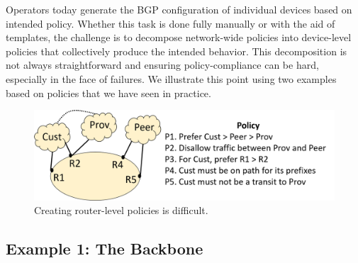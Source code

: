 %

Operators today generate the BGP configuration of individual devices based on intended policy. Whether this task is done fully manually or with the aid of templates, the challenge is to decompose network-wide policies
into device-level policies that collectively produce the intended behavior.
This decomposition is not always straightforward and ensuring policy-compliance can be hard, especially in the face of failures. We illustrate this point using two examples based on policies that we have seen in practice.

\begin{figure}[t!]
\centering
\includegraphics[width=\columnwidth]{figures/example1}
\caption{Creating router-level policies is difficult.}
\label{fig:example1}
\end{figure}

\subsection{Example 1:  The Backbone}

